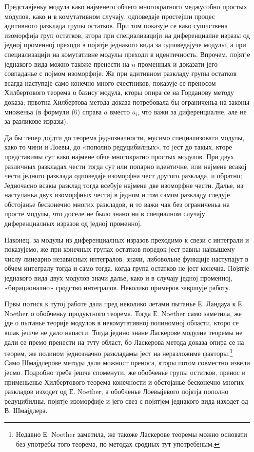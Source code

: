﻿\documentclass[11pt]{article}
\begin{document}
Представјеньу модула како најменего обчего многократного меджусобно простых модулов, како и в комутативном случају, одповедаје простејши процес адитивного разклада групы остатков. При том показује се како сушчствена изоморфија груп остатков, ктора при специализацији на диференциалне изразы од једној променној преходи в појятје једнакого вида за одповедајуче модулы, а при специализацији на комутативне модулы преходи в идентичность. Впрочем, појятје једнакого вида можно такоже пренести на \(n\) променных и доказати јего совпаданье с појмом изоморфије. Же при адитивном разкладу групы остатков всагда наступаје само конечно много счестников, показује се преносом Хилбертового теорема о базису модула, кторы опира се на Горданову методу доказа; првотна Хилбертова метода доказа потребовала бы ограниченьа на законы множеньа (в формули (6) справа \(a\) вместо \(a_i\), что важи за диференциалне, але не за разликове изразы).

Да бы тепер дојдти до теорема једнозначности, мусимо специализовати модулы, како то чини и Лоевы, до «пополно редуцибилных», то јест до такых, кторе представимы сут како најмене обче многократно простых модулов. При двух различных разкладах чести тогда сут или попарно идентичне, или најмене всакој чести једного разклада одповедаје изоморфна чест другого разклада, и обратно; Једночасно всакы разклад тогда всебује најмене две изоморфне чести. Далье, из наступаньа двух изоморфных честиј в једном и том самом разкладу следује обстојанье бесконечно многих разкладов, и то важи чак без ограниченьа на просте модулы, что доселе не было знано ни в специалном случају диференциалных изразов од једној променној.

Наконец, за модулы из диференциалных изразов преходимо к свези с интеграли и показујемо, же при конечных групах остатков поредок јест равны највышему числу линеарно независных интегралов; значи, либовольне функције наступајут в обчем интегралу тогда и само тогда, когда група остатков не јест конечна. Појятје једнакого вида двух модулов значи далье, како и в случају једној променној, «бирационално» сродство интегралов. Неколико примеров завршује работу.

Првы потиск к тутој работе дала пред неколико летами пытанье Е. Ландауа к Е. Noether о обобченьу продуктного теорема. Тогда Е. Noether само заметила, же јде о пытанье теорије модулов в некомутативној полиномној области, кторо се вшак јешче не дало напасти. Тогда једино знане Ласкерове модулне теоремы не дали се премо пренести на туту област, бо Ласкерова метода доказа опира се на теорем, же полином једнозначно разкладамы јест на неразложиме факторы.\footnote{Недавно Е. Noether заметила, же такоже Ласкерове теоремы можно основати без употребы того теорема, по методах сродных тут употребеным.} Само Шмајдлерове методы дали можност преноса, кторы потом совместно извели јесмо. Подробно треба јешче споменути, же обобченье групы остатков, пренос и применьенье Хилбертового теорема конечности и обстојанье бесконечно многих разкладов изходет од Е. Noether, а обобченье Лоевыјевого појятја пополно редуцибилны, појятје изоморфије и јего свез с појятјем једнакого вида изходет од В. Шмајдлера.
\end{document}
